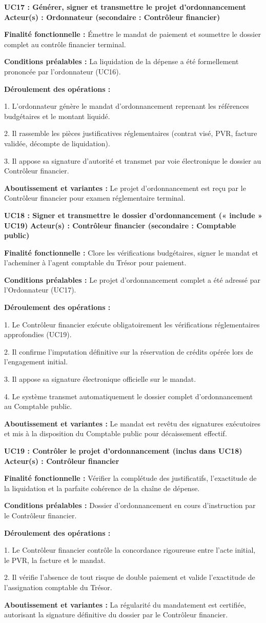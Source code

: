 \documentclass[11pt,a4paper]{article}
\newcommand{\ficheusecase}[6]{
  \vspace{0.45em}
  {\noindent\raggedright\textbf{\sffamily\normalsize\color{BleuInstitutionnel}#1} \hfill {\scriptsize\sffamily\bfseries\color{BleuSecondaire} Acteur(s) : #2}\par}
  \vspace{0.1em}
  {\small\textbf{Finalité fonctionnelle :} #3\par}
  {\small\textbf{Conditions préalables :} #4\par}
  {\small\textbf{Déroulement des opérations :}\par
  \vspace{0.05em}
  #5\par}
  \vspace{0.05em}
  {\small\color{BleuSecondaire}\textbf{Aboutissement et variantes :} #6\par}
  \vspace{0.35em}
}
\begin{document}
\ficheusecase{UC17 : Générer, signer et transmettre le projet d'ordonnancement}
{Ordonnateur (secondaire : Contrôleur financier)}
{Émettre le mandat de paiement et soumettre le dossier complet au contrôle financier terminal.}
{La liquidation de la dépense a été formellement prononcée par l'ordonnateur (UC16).}
{1. L'ordonnateur génère le mandat d'ordonnancement reprenant les références budgétaires et le montant liquidé.\par
2. Il rassemble les pièces justificatives réglementaires (contrat visé, PVR, facture validée, décompte de liquidation).\par
3. Il appose sa signature d'autorité et transmet par voie électronique le dossier au Contrôleur financier.}
{Le projet d'ordonnancement est reçu par le Contrôleur financier pour examen réglementaire terminal.}

\ficheusecase{UC18 : Signer et transmettre le dossier d'ordonnancement (« include » UC19)}
{Contrôleur financier (secondaire : Comptable public)}
{Clore les vérifications budgétaires, signer le mandat et l'acheminer à l'agent comptable du Trésor pour paiement.}
{Le projet d'ordonnancement complet a été adressé par l'Ordonnateur (UC17).}
{1. Le Contrôleur financier exécute obligatoirement les vérifications réglementaires approfondies (UC19).\par
2. Il confirme l'imputation définitive sur la réservation de crédits opérée lors de l'engagement initial.\par
3. Il appose sa signature électronique officielle sur le mandat.\par
4. Le système transmet automatiquement le dossier complet d'ordonnancement au Comptable public.}
{Le mandat est revêtu des signatures exécutoires et mis à la disposition du Comptable public pour décaissement effectif.}

\ficheusecase{UC19 : Contrôler le projet d'ordonnancement (inclus dans UC18)}
{Contrôleur financier}
{Vérifier la complétude des justificatifs, l'exactitude de la liquidation et la parfaite cohérence de la chaîne de dépense.}
{Dossier d'ordonnancement en cours d'instruction par le Contrôleur financier.}
{1. Le Contrôleur financier contrôle la concordance rigoureuse entre l'acte initial, le PVR, la facture et le mandat.\par
2. Il vérifie l'absence de tout risque de double paiement et valide l'exactitude de l'assignation comptable du Trésor.}
{La régularité du mandatement est certifiée, autorisant la signature définitive du dossier par le Contrôleur financier.}
\end{document}
